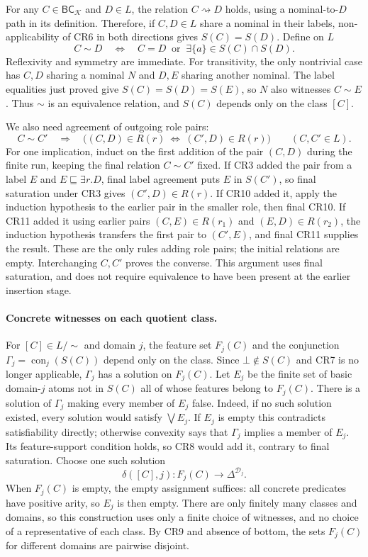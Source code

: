 For any \(C\in\mathsf{BC}_{\mathcal K}\) and \(D\in L\), the relation
\(C\rightsquigarrow D\) holds, using a nominal-to-\(D\) path in its
definition.  Therefore, if \(C,D\in L\) share a nominal in their labels,
non-applicability of CR6 in both directions gives \(S(C)=S(D)\).
Define on \(L\)
\[
 C\sim D\quad\Longleftrightarrow\quad
 C=D\ \text{ or }\ 
 \exists\{a\}\in S(C)\cap S(D).
\]
Reflexivity and symmetry are immediate.  For transitivity, the only
nontrivial case has \(C,D\) sharing a nominal \(N\) and \(D,E\) sharing
another nominal.  The label equalities just proved give
\(S(C)=S(D)=S(E)\), so \(N\) also witnesses \(C\sim E\).
Thus \(\sim\) is an equivalence relation, and \(S(C)\) depends only on
the class \([C]\).

We also need agreement of outgoing role pairs:
\[
 C\sim C'\quad\Longrightarrow\quad
 \bigl((C,D)\in R(r)\ \Longleftrightarrow\
       (C',D)\in R(r)\bigr)
 \qquad(C,C'\in L).
 \tag{R}
\]
For one implication, induct on the first addition of the pair \((C,D)\)
during the finite run, keeping the final relation \(C\sim C'\) fixed.
If CR3 added the pair from a label \(E\) and
\(E\sqsubseteq\exists r.D\), final label agreement puts \(E\) in
\(S(C')\), so final saturation under CR3 gives \((C',D)\in R(r)\).
If CR10 added it, apply the induction hypothesis to the earlier pair in
the smaller role, then final CR10.  If CR11 added it using earlier pairs
\((C,E)\in R(r_1)\) and \((E,D)\in R(r_2)\), the induction hypothesis
transfers the first pair to \((C',E)\), and final CR11 supplies the result.
These are the only rules adding role pairs; the initial relations are empty.
Interchanging \(C,C'\) proves the converse.  This argument uses final
saturation, and does not require equivalence to have been present at the
earlier insertion stage.

\paragraph{Concrete witnesses on each quotient class.}
For \([C]\in L/{\sim}\) and domain \(j\), the feature set \(F_j(C)\)
and the conjunction \(\Gamma_j=\operatorname{con}_j(S(C))\) depend only
on the class.  Since \(\bot\notin S(C)\) and CR7 is no longer applicable,
\(\Gamma_j\) has a solution on \(F_j(C)\).
Let \(E_j\) be the finite set of basic domain-\(j\) atoms not in \(S(C)\)
all of whose features belong to \(F_j(C)\).
There is a solution of \(\Gamma_j\) making every member of \(E_j\)
false.  Indeed, if no such solution existed, every solution would satisfy
\(\bigvee E_j\).  If \(E_j\) is empty this contradicts satisfiability
directly; otherwise convexity says that \(\Gamma_j\) implies a member
of \(E_j\).  Its feature-support condition holds, so CR8 would add it,
contrary to final saturation.  Choose one such solution
\[
 \delta([C],j):F_j(C)\longrightarrow\Delta^{\mathcal D_j}.
 \tag{F}
\]
When \(F_j(C)\) is empty, the empty assignment suffices: all concrete
predicates have positive arity, so \(E_j\) is then empty.
There are only finitely many classes and domains, so this construction uses
only a finite choice of witnesses, and no choice of a representative of each
class.  By CR9 and absence of bottom, the sets \(F_j(C)\) for different
domains are pairwise disjoint.

